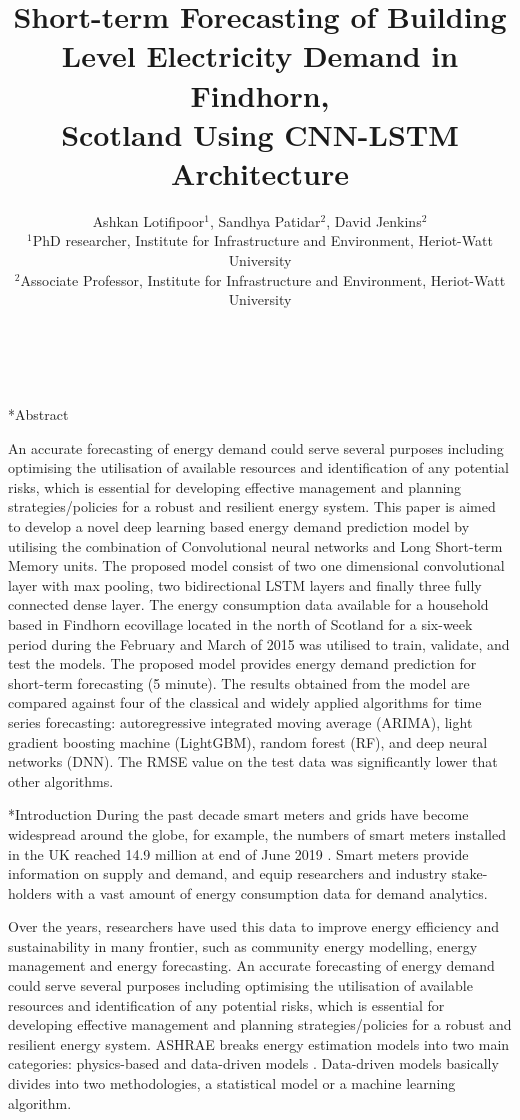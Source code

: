 \documentclass[twocolumn, a4paper,10pt]{article}
\title{%
Short-term Forecasting of Building Level Electricity Demand in Findhorn,\\	%
\vspace{4pt}
Scotland Using CNN-LSTM Architecture %
}
\author{
Ashkan Lotifipoor$^1$, Sandhya Patidar$^2$, David Jenkins$^2$\\ %
$^1$PhD researcher, Institute for Infrastructure and Environment, Heriot-Watt University\\ %
$^2$Associate Professor, Institute for Infrastructure and Environment, Heriot-Watt University\\ %
\\ %
\\ %
} %
\date{\vspace{-0.5cm}}	%
\makeatletter
\renewcommand\section{\@startsection{section}{1}{\z@}{0.25cm}{0.1cm}{\normalfont\large\bfseries}}
\makeatother
\begin{document}
\maketitle

\section*{Abstract}	%
\addtocounter{section}{1}
An accurate forecasting of energy demand could serve several purposes including optimising the utilisation of available resources and identification of any potential risks, which is essential for developing effective management and planning strategies/policies for a robust and resilient energy system. This paper is aimed to develop a novel deep learning based energy demand prediction model by utilising the combination of Convolutional neural networks and Long Short-term Memory units. The proposed model consist of two one dimensional convolutional layer with max pooling, two bidirectional LSTM layers and finally three fully connected dense layer. The energy consumption data available for a household based in Findhorn ecovillage located in the north of Scotland for a six-week period during the February and March of 2015 was utilised to train, validate, and test the models. The proposed model provides energy demand prediction for short-term forecasting (5 minute). The results obtained from the model are compared against four of the classical and widely applied algorithms for time series forecasting: autoregressive integrated moving average (ARIMA), light gradient boosting machine (LightGBM), random forest (RF), and deep neural networks (DNN). The RMSE value on the test data was significantly lower that other algorithms.

\section*{Introduction}
During the past decade smart meters and grids have become widespread around the globe, for example, the numbers of smart meters installed in the UK reached 14.9 million at end of June 2019 \citep{RN1251}. Smart meters provide information on supply and demand, and equip researchers and industry stake-holders with a vast amount of energy consumption data for demand analytics. 

Over the years, researchers have used this data to improve energy efficiency and sustainability in many frontier, such as community energy modelling, energy management and energy forecasting. An accurate forecasting of energy demand could serve several purposes including optimising the utilisation of available resources and identification of any potential risks, which is essential for developing effective management and planning strategies/policies for a robust and resilient energy system. ASHRAE breaks energy estimation models into two main categories: physics-based and data-driven models \citep{RN1250}. Data-driven models basically divides into two methodologies, a statistical model or a machine learning algorithm.
\end{document}
